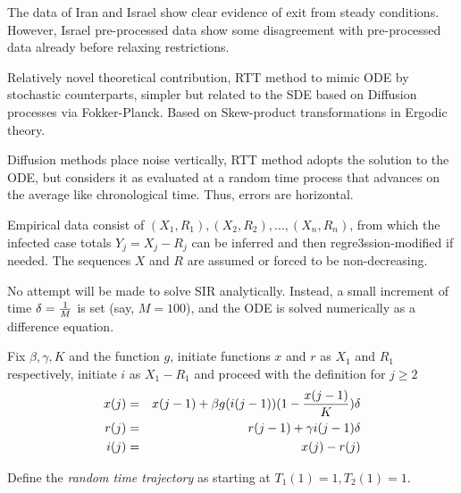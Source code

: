 \documentclass{article}
\begin{document}
\bigskip

The data of Iran and Israel show clear evidence of exit from steady conditions. However, Israel pre-processed data show some disagreement with pre-processed data already before relaxing restrictions.

\newpage


\bigskip

\noindent Relatively novel theoretical contribution, RTT method to mimic ODE by stochastic counterparts, simpler but related to the SDE based on Diffusion processes via Fokker-Planck. Based on Skew-product transformations in Ergodic theory.

\bigskip

\noindent Diffusion methods place noise vertically, RTT method adopts the solution to the ODE, but considers it as evaluated at a random time process that advances on the average like chronological time. Thus, errors are horizontal.

\bigskip

\noindent Empirical data consist of $(X_1,R_1), (X_2,R_2), \dots, (X_n, R_n)$, from which the infected case totals \linebreak $Y_j=X_j-R_j$ can be inferred and then regre3ssion-modified if needed. The sequences $X$ and $R$ are assumed or forced to be non-decreasing.

\bigskip

\noindent No attempt will be made to solve SIR analytically. Instead, a small increment of time $\delta={1 \over M}$ is set (say, $M=100$), and the ODE is solved numerically as a difference equation. 

\newpage

\noindent Fix $\beta, \gamma, K$ and the function $g$, initiate functions $x$ and $r$ as $X_1$ and $R_1$ respectively, initiate $i$ as $X_1-R_1$ and proceed with the definition for $j \ge 2$
\begin{eqnarray}
x(j)&=&x(j-1)+\beta g(i(j-1))(1-{{x(j-1)} \over K}) \delta \nonumber \\
r(j)&=&r(j-1)+\gamma i(j-1) \delta \nonumber \\
i(j)&=&x(j)-r(j) \label{thesolution}
\end{eqnarray}

\bigskip

\noindent Define the {\em random time trajectory} as starting at $T_1(1)=1, T_2(1)=1$. 
\end{document}
